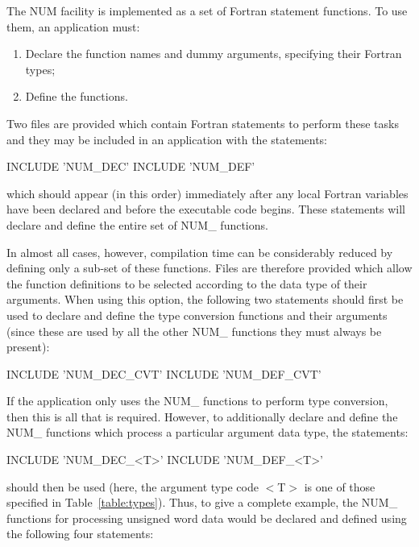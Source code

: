 \documentclass[11pt,nolof]{starlink}
\providecommand{\name}[1]{\mbox{#1}}
\begin{document}
The \name{NUM} facility is implemented as a set of Fortran statement
functions.  To use them, an application must:

\begin{enumerate}

\item Declare the function names and dummy arguments, specifying their
Fortran types;

\item Define the functions.

\end{enumerate}

Two files are provided which contain Fortran statements to perform these
tasks and they may be included in an application with the statements:

\begin{terminalv}
INCLUDE 'NUM_DEC'
INCLUDE 'NUM_DEF'
\end{terminalv}

which should appear (in this order) immediately after any local Fortran
variables have been declared and before the executable code begins.
These statements will declare and define the entire set of \name{NUM\_}
functions.

In almost all cases, however, compilation time can be considerably reduced
by defining only a sub-set of these functions.
Files are therefore provided which allow the function definitions to be
selected according to the data type of their arguments.
When using this option, the following two statements should first be used to
declare and define the type conversion functions and their arguments (since
these are used by all the other \name{NUM\_} functions they must always be
present):

\begin{terminalv}
INCLUDE 'NUM_DEC_CVT'
INCLUDE 'NUM_DEF_CVT'
\end{terminalv}

If the application only uses the \name{NUM\_} functions to perform type
conversion, then this is all that is required.
However, to additionally declare and define the \name{NUM\_} functions which
process a particular argument data type, the statements:

\begin{terminalv}
INCLUDE 'NUM_DEC_<T>'
INCLUDE 'NUM_DEF_<T>'
\end{terminalv}

should then be used (here, the argument type code \name{$<$T$>$} is one of
those specified in Table~\ref{table:types}).
Thus, to give a complete example, the \name{NUM\_} functions for processing
unsigned word data would be declared and defined using the following four
statements:
\end{document}
